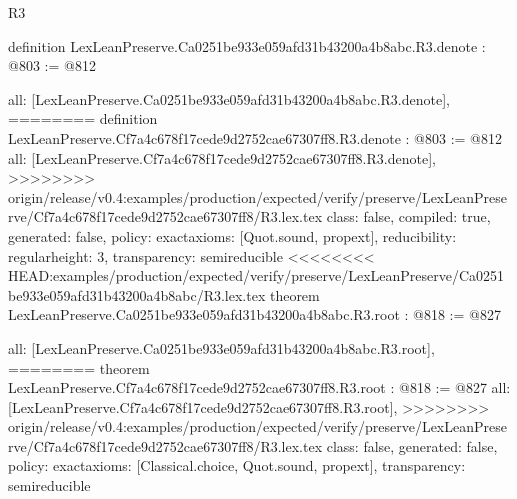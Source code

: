 \begin{lexlean}{R3}
\begin{coremodule}
{{{{{{definition LexLeanPreserve.Ca0251be933e059afd31b43200a4b8abc.R3.denote : @803 := @812 {
  all: [LexLeanPreserve.Ca0251be933e059afd31b43200a4b8abc.R3.denote],
========
definition LexLeanPreserve.Cf7a4c678f17cede9d2752cae67307ff8.R3.denote : @803 := @812 {
  all: [LexLeanPreserve.Cf7a4c678f17cede9d2752cae67307ff8.R3.denote],
>>>>>>>> origin/release/v0.4:examples/production/expected/verify/preserve/LexLeanPreserve/Cf7a4c678f17cede9d2752cae67307ff8/R3.lex.tex
  class: false,
  compiled: true,
  generated: false,
  policy: exact{axioms: [Quot.sound, propext]},
  reducibility: regular{height: 3},
  transparency: semireducible
}
<<<<<<<< HEAD:examples/production/expected/verify/preserve/LexLeanPreserve/Ca0251be933e059afd31b43200a4b8abc/R3.lex.tex
theorem LexLeanPreserve.Ca0251be933e059afd31b43200a4b8abc.R3.root : @818 := @827 {
  all: [LexLeanPreserve.Ca0251be933e059afd31b43200a4b8abc.R3.root],
========
theorem LexLeanPreserve.Cf7a4c678f17cede9d2752cae67307ff8.R3.root : @818 := @827 {
  all: [LexLeanPreserve.Cf7a4c678f17cede9d2752cae67307ff8.R3.root],
>>>>>>>> origin/release/v0.4:examples/production/expected/verify/preserve/LexLeanPreserve/Cf7a4c678f17cede9d2752cae67307ff8/R3.lex.tex
  class: false,
  generated: false,
  policy: exact{axioms: [Classical.choice, Quot.sound, propext]},
  transparency: semireducible
}

}}}}}}}}
\end{coremodule}
\end{lexlean}
